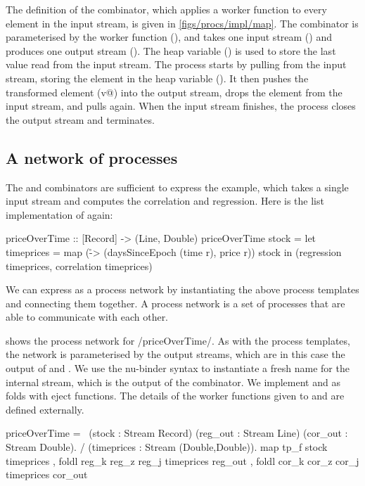 The definition of the \lstiproc@map@ combinator, which applies a worker function to every element in the input stream, is given in \cref{figs/procs/impl/map}.
The combinator is parameterised by the worker function (\lstiproc@f@), and takes one input stream (\lstiproc@sIn@) and produces one output stream (\lstiproc@sOut@).
The heap variable (\lstiproc@v@) is used to store the last value read from the input stream.
The process starts by pulling from the input stream, storing the element in the heap variable (\lstiproc@v@).
It then pushes the transformed element (\lstiproc@f v@) into the output stream, drops the element from the input stream, and pulls again.
When the input stream finishes, the process closes the output stream and terminates.

\subsection{A network of processes}
The \lstiproc@map@ and \lstiproc@foldl@ combinators are sufficient to express the \lstiproc@priceOverTime@ example, which takes a single input stream and computes the correlation and regression.
Here is the list implementation of \lstiproc@priceOverTime@ again:

\begin{haskell}
priceOverTime :: [Record] -> (Line, Double)
priceOverTime stock =
  let timeprices = map (\r -> (daysSinceEpoch (time r), price r)) stock
  in (regression timeprices, correlation timeprices)
\end{haskell}

We can express \lstiproc@priceOverTime@ as a process network by instantiating the above process templates and connecting them together.
A process network is a set of processes that are able to communicate with each other.

 shows the process network for \Hs/priceOverTime/.
As with the process templates, the network is parameterised by the output streams, which are in this case the output of \lstiproc@regression@ and \lstiproc@correlation@.
We use the nu-binder syntax to instantiate a fresh name for the \lstiproc@timeprices@ internal stream, which is the output of the \lstiproc@map@ combinator.
We implement \lstiproc@regression@ and \lstiproc@correlation@ as folds with eject functions.
The details of the worker functions given to \lstiproc@map@ and \lstiproc@foldl@ are defined externally.

\begin{process}[float,caption=Process network for \Hs/priceOverTime/,label=figs/procs/net/priceOverTime]
priceOverTime =
  \ (stock : Stream Record)
    (reg_out : Stream Line) (cor_out : Stream Double).
  / (timeprices : Stream (Double,Double)).
     { map    tp_f             stock      timeprices
     , foldl reg_k reg_z reg_j timeprices reg_out
     , foldl cor_k cor_z cor_j timeprices cor_out }
\end{process}


